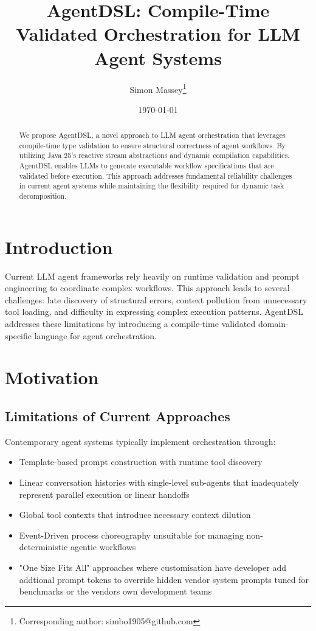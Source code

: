 \documentclass[11pt,a4paper]{article}
\title{AgentDSL: Compile-Time Validated Orchestration for LLM Agent Systems}
\author{Simon Massey\thanks{Corresponding author: simbo1905@github.com}}
\date{\today}
\begin{document}
\maketitle

\begin{abstract}
We propose AgentDSL, a novel approach to LLM agent orchestration that leverages compile-time type validation to ensure structural correctness of agent workflows. By utilizing Java 25's reactive stream abstractions and dynamic compilation capabilities, AgentDSL enables LLMs to generate executable workflow specifications that are validated before execution. This approach addresses fundamental reliability challenges in current agent systems while maintaining the flexibility required for dynamic task decomposition.
\end{abstract}

\section{Introduction}

Current LLM agent frameworks rely heavily on runtime validation and prompt engineering to coordinate complex workflows. This approach leads to several challenges: late discovery of structural errors, context pollution from unnecessary tool loading, and difficulty in expressing complex execution patterns. AgentDSL addresses these limitations by introducing a compile-time validated domain-specific language for agent orchestration.

\section{Motivation}

\subsection{Limitations of Current Approaches}

Contemporary agent systems typically implement orchestration through:
\begin{itemize}
    \item Template-based prompt construction with runtime tool discovery
    \item Linear conversation histories with single-level sub-agents that inadequately represent parallel execution or linear handoffs
    \item Global tool contexts that introduce necessary context dilution
    \item Event-Driven process choreography unsuitable for managing non-deterministic agentic workflows
    \item "One Size Fits All" approaches where customisation have developer add addtional prompt tokens to override hidden vendor system prompts tuned for benchmarks or the vendors own development teams
\end{itemize}
\end{document}
